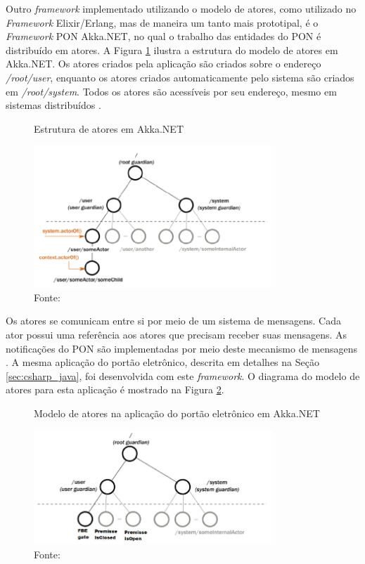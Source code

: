 Outro \textit{framework} implementado utilizando o modelo de atores, como
utilizado no \textit{Framework} Elixir/Erlang, mas de maneira um tanto mais
prototipal, é o \textit{Framework} PON Akka.NET, no qual o trabalho das
entidades do PON é distribuído em atores. A Figura \ref{fig:akka_actor} ilustra
a estrutura do modelo de atores em Akka.NET. Os atores criados pela aplicação
são criados sobre o endereço \textit{/root/user}, enquanto os atores criados
automaticamente pelo sistema são criados em \textit{/root/system}. Todos os
atores são acessíveis por seu endereço, mesmo em sistemas distribuídos
\cite{martini_2019}.

\begin{figure}[!htb]
  \centering
  \caption{Estrutura de atores em Akka.NET}
  \includegraphics[width=0.8\textwidth]{../figures/atores_akka.png}
  \smallskip
  \caption*{Fonte: }
  \label{fig:akka_actor}
\end{figure}

Os atores se comunicam entre si por meio de um sistema de mensagens. Cada ator
possui uma referência aos atores que precisam receber suas mensagens. As
notificações do PON são implementadas por meio deste mecanismo de mensagens
\cite{martini_2019}. A mesma aplicação do portão eletrônico, descrita em
detalhes na Seção \ref{sec:csharp_java}, foi desenvolvida com este \textit{framework}.
O diagrama do modelo de atores para esta aplicação é mostrado na Figura
\ref{fig:akka_portao}.

\begin{figure}[!htb]
  \centering
  \caption{Modelo de atores na aplicação do portão eletrônico em Akka.NET}
  \includegraphics[width=0.8\textwidth]{../figures/akka_actor.png}
  \smallskip
  \caption*{Fonte: }
  \label{fig:akka_portao}
\end{figure}


